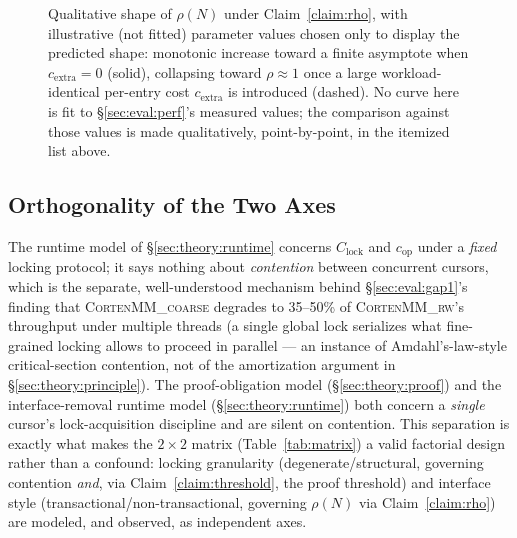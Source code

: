\documentclass[10pt]{article}
\newcommand{\corten}[1]{\textsc{CortenMM\_#1}}
\begin{document}
\begin{figure}[h]
\centering
{}
\caption{Qualitative shape of $\rho(N)$ under Claim~\ref{claim:rho},
with illustrative (not fitted) parameter values chosen only to display
the predicted shape: monotonic increase toward a finite asymptote when
$c_{\mathrm{extra}}{=}0$ (solid), collapsing toward $\rho{\approx}1$
once a large workload-identical per-entry cost $c_{\mathrm{extra}}$ is
introduced (dashed). No curve here is fit to
\S\ref{sec:eval:perf}'s measured values; the comparison against those
values is made qualitatively, point-by-point, in the itemized list
above.}
\label{fig:rho-model}
\end{figure}

\subsection{Orthogonality of the Two Axes}
\label{sec:theory:orthogonal}

The runtime model of \S\ref{sec:theory:runtime} concerns $C_{\mathrm{lock}}$
and $c_{\mathrm{op}}$ under a \emph{fixed} locking protocol; it says
nothing about \emph{contention} between concurrent cursors, which is
the separate, well-understood mechanism behind
\S\ref{sec:eval:gap1}'s finding that \corten{coarse} degrades to
35--50\% of \corten{rw}'s throughput under multiple threads (a single
global lock serializes what fine-grained locking allows to proceed in
parallel --- an instance of Amdahl's-law-style critical-section
contention, not of the amortization argument in
\S\ref{sec:theory:principle}). The proof-obligation model
(\S\ref{sec:theory:proof}) and the interface-removal runtime model
(\S\ref{sec:theory:runtime}) both concern a \emph{single} cursor's
lock-acquisition discipline and are silent on contention. This
separation is exactly what makes the $2{\times}2$ matrix
(Table~\ref{tab:matrix}) a valid factorial design rather than a
confound: locking granularity (degenerate/structural, governing
contention \emph{and}, via Claim~\ref{claim:threshold}, the proof
threshold) and interface style (transactional/non-transactional,
governing $\rho(N)$ via Claim~\ref{claim:rho}) are modeled, and
observed, as independent axes.
\end{document}
